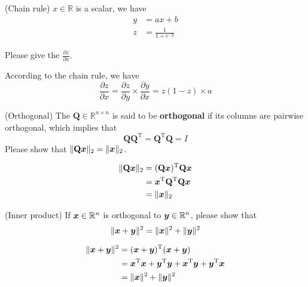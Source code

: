 \documentclass[a4paper, 12pt, answers]{exam} %
\begin{document}
\begin{questions}
\question
(Chain rule) $x\in\mathbb{R}$ is a scalar, we have 
\begin{equation*}
\begin{aligned}
y &= ax + b \\
z &= \frac1{1+e^{-y}} 
\end{aligned}
\end{equation*} 

Please give the $\frac{\partial z}{\partial x}$.

\begin{solution}
	According to the chain rule, we have
	\begin{equation*}
	\frac{\partial z}{\partial x} = \frac{\partial z}{\partial y} \times \frac{\partial y}{\partial x} 
	= z(1-z) \times a 
	\end{equation*}
\end{solution}

\question
(Orthogonal) The $\mathbf{Q} \in \mathbb{R}^{n \times n}$ is said to be \textbf{orthogonal} if its columns are pairwise orthogonal, which implies that 
\begin{equation*}
\mathbf{Q}\mathbf{Q}^{\mathrm{T}} = \mathbf{Q}^{\mathrm{T}}\mathbf{Q} = I
\end{equation*}
Please show that $\|\mathbf{Q}\bm{x}\|_2=\|\bm{x}\|_2$.

\begin{solution}
	
	\begin{equation*}
	\begin{aligned}
	\| \mathbf{Q}\bm{x}\|_2 &= (\mathbf{Q} \bm{x})^{\mathrm{T}} \mathbf{Q} \bm{x} \\
	&= \bm{x}^{\mathrm{T}} \mathbf{Q}^{\mathrm{T}}\mathbf{Q} \bm{x} \\
	&= \| \bm{x} \|_2	
	\end{aligned}
	\end{equation*}
	
\end{solution}


\question (Inner product) If $\bm{x} \in \mathbb{R}^n$ is orthogonal to $\bm{y} \in \mathbb{R}^n$, please show that
\begin{equation*}
\| \bm{x} + \bm{y} \|^2  = \|\bm{x}\|^2 + \|\bm{y}\|^2
\end{equation*}

\begin{solution}
	\begin{equation*}
	\begin{aligned}
	\| \bm{x} + \bm{y} \|^2 &= (\bm{x} + \bm{y})^{\mathrm{T}}(\bm{x} + \bm{y}) \\
	&= \bm{x}^{\mathrm{T}}\bm{x} + \bm{y}^{\mathrm{T}}\bm{y} + \bm{x}^{\mathrm{T}}\bm{y} + \bm{y}^{\mathrm{T}}\bm{x} \\
	&= \|\bm{x}\|^2 + \|\bm{y}\|^2
	\end{aligned}
	\end{equation*}
\end{solution}



\end{questions}
\end{document}
